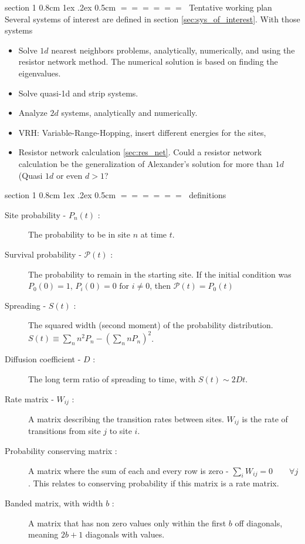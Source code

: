\documentclass[onecolumn,fleqn,notitlepage,secnumarabic]{revtex4}
\makeatletter
\def\section{%
  \@startsection
    {section}%
    {1}%
    {\z@}%
    {0.8cm \@plus1ex \@minus .2ex}%
    {0.5cm}%
    {\Large\bf $=\!=\!=\!=\!=\!=\;$}%
}%
\makeatother
\begin{document}
\section{Tentative working plan}
Several systems of interest are defined in section \ref{sec:sys_of_interest}. With those systems 
\begin{itemize}
    \item Solve $1d$ nearest neighbors problems, analytically, numerically, and using the resistor network method. The numerical solution is based on finding the eigenvalues.
    \item Solve quasi-1d and strip systems.
    \item Analyze $2d$ systems, analytically and numerically.
    \item VRH: Variable-Range-Hopping, insert different energies for the sites, 
    \item Resistor network calculation \ref{sec:res_net}. Could a resistor network calculation be the generalization of Alexander's solution for more than $1d$ (Quasi $1d$ or even $d>1$?

\end{itemize}

\section{definitions}\label{sec:definitions}
\begin{description}
    \item[Site probability - $P_n(t)$ : ] The probability to be in site $n$ at time $t$.
    \item[Survival probability - $\mathcal{P}(t)$ : ] The probability to remain in the starting site. If the initial condition was $P_0(0)=1$, $P_i(0)=0 \textrm{  for  } i\neq 0$, then $\mathcal{P}(t)= P_0(t)$
    \item[Spreading - $S(t)$ : ] The squared width (second moment) of the probability distribution. $S(t) \equiv \sum_n n^2 P_n -\left(\sum_n n P_n\right)^2$. 
    \item[Diffusion coefficient - $D$ : ] The long term ratio of spreading to time, with $S(t) \sim 2Dt$.
    \item[Rate matrix - $W_{ij}$ : ] A matrix describing the transition rates between sites. $W_{ij}$ is the rate of transitions from site $j$ to site $i$.
    \item[Probability conserving matrix : ]\label{def:prob_conserv} A matrix where the sum of each and every row is zero - $\sum_i W_{ij} = 0 \qquad \forall j$. This relates to conserving probability if this matrix is a rate matrix.
    \item[Banded matrix, with width $b$ : ] A matrix that has non zero values only within the first $b$ off diagonals, meaning $2b+1$ diagonals with values.
\end{description}
\end{document}
